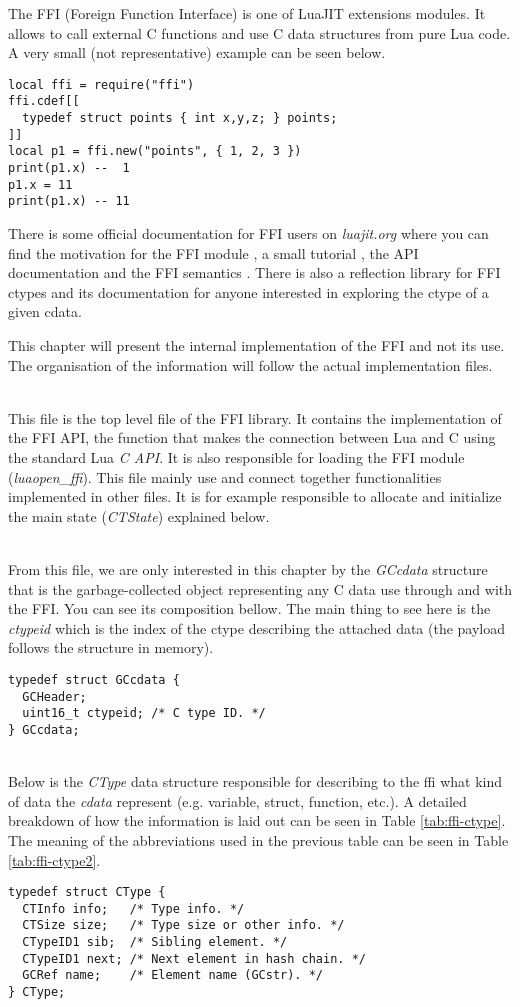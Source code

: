     The FFI (Foreign Function Interface) is one of LuaJIT extensions modules. It
allows to call external C functions and use C data structures from pure Lua code.
A very small (not representative) example can be seen below.

\begin{lstlisting}[style=LuaStyle]
local ffi = require("ffi")
ffi.cdef[[
  typedef struct points { int x,y,z; } points;
]]
local p1 = ffi.new("points", { 1, 2, 3 })
print(p1.x) --  1
p1.x = 11
print(p1.x) -- 11
\end{lstlisting}
There is some official documentation for FFI users on \emph{luajit.org}
where you can find the motivation for the FFI module \cite{ffi-motivation},
a small tutorial \cite{ffi-tuto}, the API documentation \cite{ffi-api} and the
FFI semantics \cite{ffi-semantics}. There is also a reflection
library for FFI ctypes \cite{ffi-reflect} and its documentation
\cite{ffi-reflect-doc} for anyone interested in exploring the ctype of a given cdata.

This chapter will present the internal implementation of the FFI and not its use.
The organisation of the information will follow the actual implementation files.

\\
This file is the top level file of the FFI library. It contains the
implementation of the FFI API, the function that makes the connection between
Lua and C using the standard Lua \emph{C API}.
It is also responsible for loading the FFI module (\emph{luaopen\_ffi}).
This file mainly use and connect together functionalities implemented in other
files. It is for example responsible to allocate and initialize the main state
(\emph{CTState}) explained below.

\\
From this file, we are only interested in this chapter by the \emph{GCcdata}
structure that is the garbage-collected object representing any C data use
through and with the FFI. You can see its composition bellow. The main thing to
see here is the \emph{ctypeid} which is the index of the ctype describing the
attached data (the payload follows the structure in memory).
\begin{lstlisting}[style=CStyle]
typedef struct GCcdata {
  GCHeader;
  uint16_t ctypeid;	/* C type ID. */
} GCcdata;
\end{lstlisting}

\\
Below is the \emph{CType} data structure responsible for describing to the ffi
what kind of data the \emph{cdata} represent (e.g. variable, struct,
function, etc.). A detailed breakdown of how the information is laid out can
be seen in Table \ref{tab:ffi-ctype}. The meaning of the abbreviations used in
the previous table can be seen in Table \ref{tab:ffi-ctype2}.
\begin{lstlisting}[style=CStyle]
typedef struct CType {
  CTInfo info;   /* Type info. */
  CTSize size;   /* Type size or other info. */
  CTypeID1 sib;  /* Sibling element. */
  CTypeID1 next; /* Next element in hash chain. */
  GCRef name;    /* Element name (GCstr). */
} CType;
\end{lstlisting}

